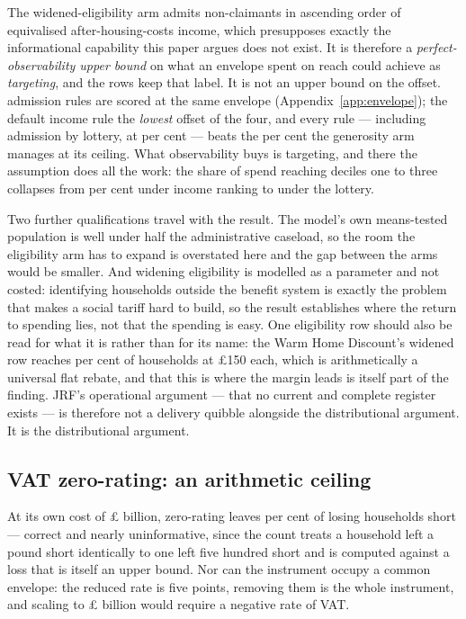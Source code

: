 The widened-eligibility arm admits non-claimants in ascending order of equivalised after-housing-costs income, which presupposes exactly the informational capability this paper argues does not exist. It is therefore a \emph{perfect-observability upper bound} on what an envelope spent on reach could achieve as \emph{targeting}, and the rows keep that label. It is not an upper bound on the offset. \genSocialTariffAdmissionRuleCount{} admission rules are scored at the same envelope (Appendix~\ref{app:envelope}); the default income rule \genSocialTariffAdmissionDefaultIsWorstOffset{} the \emph{lowest} offset of the four, and every rule --- including admission by lottery, at \genSocialTariffAdmissionRandomOffsetPct{} per cent --- beats the \genSocialTariffEnvelopeOffsetPct{} per cent the generosity arm manages at its ceiling. What observability buys is targeting, and there the assumption does all the work: the share of spend reaching deciles one to three collapses from \genSocialTariffAdmissionAhcBottomThreePct{} per cent under income ranking to \genSocialTariffAdmissionRandomBottomThreePct{} under the lottery.

Two further qualifications travel with the result. The model's own means-tested population is well under half the administrative caseload, so the room the eligibility arm has to expand is overstated here and the gap between the arms would be smaller. And widening eligibility is modelled as a parameter and not costed: identifying households outside the benefit system is exactly the problem that makes a social tariff hard to build, so the result establishes where the return to spending lies, not that the spending is easy. One eligibility row should also be read for what it is rather than for its name: the Warm Home Discount's widened row reaches \genWhdEligibleSharePct{} per cent of households at \pounds 150 each, which is arithmetically a universal flat rebate, and that this is where the margin leads is itself part of the finding. JRF's operational argument --- that no current and complete register exists --- is therefore not a delivery quibble alongside the distributional argument. It is the distributional argument.

\subsection{VAT zero-rating: an arithmetic ceiling}

At its own cost of \pounds\genVatCutCostBn{} billion, zero-rating leaves \genVatCutUncompensatedShare{} per cent of losing households short --- correct and nearly uninformative, since the count treats a household left a pound short identically to one left five hundred short and is computed against a loss that is itself an upper bound. Nor can the instrument occupy a common envelope: the reduced rate is five points, removing them is the whole instrument, and scaling to \pounds \genEnvelopeBn{} billion would require a negative rate of VAT.

